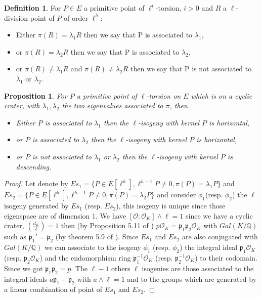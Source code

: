 \documentclass{article}
\theoremstyle{plain}
\newtheorem{prop}[thm]{Proposition}
\theoremstyle{definition}
\newtheorem{defi}[thm]{Definition}
\theoremstyle{remark}
\begin{document}
\begin{defi}
For $P \in E$ a primitive point of $\ell^i$-torsion, $i>0$ and $R$ a $\ell$-division point of $P$ of order $\ell^h$:
\begin{itemize}
\item Either $\pi(R)=\lambda_1 R$ then we say that P is associated to $\lambda_1$, 
\item or $\pi(R)=\lambda_2 R$ then we say that P is associated to $\lambda_2$,
\item or $\pi(R)\neq \lambda_1 R$ and $\pi(R)\neq \lambda_2 R$ then we say that P is not associated to $\lambda_1$ or $\lambda_2$.
\end{itemize}  
\end{defi}

\begin{prop} \label{conjecture}
For $P$ a primitive point of $\ell$-torsion on $E$ which is on a cyclic crater, with $\lambda_1, \lambda_2$ the two eigenvalues associated to $\pi$, then
\begin{itemize}
\item Either $P$ is associated to $\lambda_1$ then the $\ell$-isogeny with kernel $P$ is horizontal,
\item or $P$ is associated to $\lambda_2$ then the $\ell$-isogeny with kernel $P$ is horizontal,
\item or $P$ is not associated to $\lambda_1$ or $\lambda_2$ then the $\ell$-isogeny with kernel $P$ is descending.
\end{itemize} 
\end{prop}

\begin{proof}
Let denote by $Es_1=\{P \in E[\ell^h], \ell^{h-1}P \neq 0, \pi(P)=\lambda_1P\}$ and $Es_2=\{P \in E[\ell^h], \ell^{h-1}P \neq 0, \pi(P)=\lambda_2P\}$ and consider $\phi_1$(resp. $\phi_2$) the $\ell$isogeny generated by $Es_1$ (resp. $Es_2$), this isogeny is unique since those eigenspace are of dimension $1$. We have $[\mathcal{O}:\mathcal{O}_K]\wedge \ell =1$ since we have a cyclic crater, $\left( \frac{d_K}{\ell} \right)=1$ then (by Proposition 5.11 of \cite{Cox89} )  $p\mathcal{O}_K=\mathfrak{p}_1\mathfrak{p}_2\mathcal{O}_K$ with $Gal(K/\mathbb{Q})$ such as $\mathfrak{p}_1'=\mathfrak{p}_2$ (by theorem 5.9 of \cite{Cox89}). Since $Es_1$ and $Es_2$ are also conjugated with $Gal(K/\mathbb{Q})$ we can associate to the isogeny $\phi_1$ (resp. $\phi_2$)  the integral ideal $\mathfrak{p}_1\mathcal{O}_K$ (resp. $\mathfrak{p}_2\mathcal{O}_K$) and the endomorphism ring $\mathfrak{p}_1^{-1}\mathcal{O}_K$ (resp. $\mathfrak{p}_2^{-1}\mathcal{O}_K$) to their codomain. Since we got $\mathfrak{p}_1\mathfrak{p}_2=p$. The $\ell - 1$ others $\ell$ isogenies are those associated to the integral ideals $a  \mathfrak{p}_1 + \mathfrak{p}_2$ with $a \wedge \ell =1$ and to the groups which are generated by a linear combination of point of $Es_1$ and $Es_2$.
\end{proof}
\end{document}
